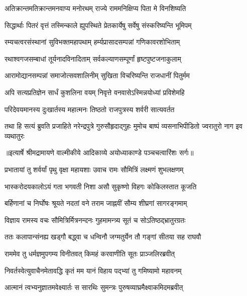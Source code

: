 \twolineshloka
{अतिक्रान्तमतिक्रान्तमनवाप्य मनोरथम्}
{राज्ये राममनिक्षिप्य पिता मे विनशिष्यति} %

\twolineshloka
{सिद्धार्थाः पितरं वृत्तं तस्मिन्काले ह्युपस्थिते}
{प्रेतकार्येषु सर्वेषु संस्करिष्यन्ति भूमिपम्} %

\twolineshloka
{रम्यचत्वरसंस्थानां सुविभक्तमहापथाम्}
{हर्म्यप्रासादसम्पन्नां गणिकावरशोभिताम्} %

\twolineshloka
{रथाश्वगजसम्बाधां तूर्यनादविनादिताम्}
{सर्वकल्याणसम्पूर्णां हृष्टपुष्टजनाकुलाम्} %

\twolineshloka
{आरामोद्यानसम्पन्नां समाजोत्सवशालिनीम्}
{सुखिता विचरिष्यन्ति राजधानीं पितुर्मम} %

\twolineshloka
{अपि सत्यप्रतिज्ञेन सार्धं कुशलिना वयम्}
{निवृत्ते वनवासेऽस्मिन्नयोध्यां प्रविशेमहि} %

\twolineshloka
{परिदेवयमानस्य दुःखार्तस्य महात्मनः}
{तिष्ठतो राजपुत्रस्य शर्वरी सात्यवर्तत} %

\fourlineindentedshloka
{तथा हि सत्यं ब्रुवति प्रजाहिते}
{नरेन्द्रपुत्रे गुरुसौहृदाद्गुहः}
{मुमोच बाष्पं व्यसनाभिपीडितो}
{ज्वरातुरो नाग इव व्यथातुरः} %


{॥इत्यार्षे श्रीमद्रामायणे वाल्मीकीये आदिकाव्ये अयोध्याकाण्डे पञ्चचत्वारिंशः सर्गः॥}


\twolineshloka
{प्रभातायां तु शर्वर्यां पृथु वृक्षा महायशाः}
{उवाच रामः सौमित्रिं लक्ष्मणं शुभलक्षणम्} %

\twolineshloka
{भास्करोदयकालोऽयं गता भगवती निशा}
{असौ सुकृष्णो विहगः कोकिलस्तात कूजति} %

\twolineshloka
{बर्हिणानां च निर्घोषः श्रूयते नदतां वने}
{तराम जाह्नवीं सौम्य शीघ्रगां सागरङ्गमाम्} %

\twolineshloka
{विज्ञाय रामस्य वचः सौमित्रिर्मित्रनन्दनः}
{गुहमामन्त्र्य सूतं च सोऽतिष्ठद्भ्रातुरग्रतः} %

\twolineshloka
{ततः कलापान्संनह्य खड्गौ बद्ध्वा च धन्विनौ}
{जग्मतुर्येन तौ गङ्गां सीतया सह राघवौ} %

\twolineshloka
{राममेव तु धर्मज्ञमुपगम्य विनीतवत्}
{किमहं करवाणीति सूतः प्राञ्जलिरब्रवीत्} %

\twolineshloka
{निवर्तस्वेत्युवाचैनमेतावद्धि कृतं मम}
{यानं विहाय पद्भ्यां तु गमिष्यामो महावनम्} %

\twolineshloka
{आत्मानं त्वभ्यनुज्ञातमवेक्ष्यार्तः स सारथिः}
{सुमन्त्रः पुरुषव्याघ्रमैक्ष्वाकमिदमब्रवीत्} %

